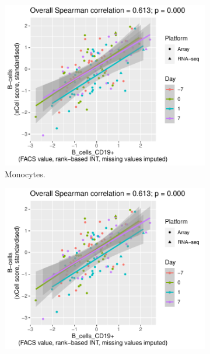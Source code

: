 \begin{figure}
    \centering
    \begin{subfigure}[b]{0.43\textwidth}
        \centering
        \includegraphics[width=1.0\textwidth,page=6]{mainmatter/figures/chapter_03/validate_xCell_estimates.cell_type_pairs.pdf}
        \caption[]{Monocytes.}
    \end{subfigure}
    \bigskip\vfill
    \begin{subfigure}[b]{0.43\textwidth}
        \centering
        \includegraphics[width=1.0\textwidth,page=3]{mainmatter/figures/chapter_03/validate_xCell_estimates.cell_type_pairs.pdf}

\end{subfigure}
\end{figure}
